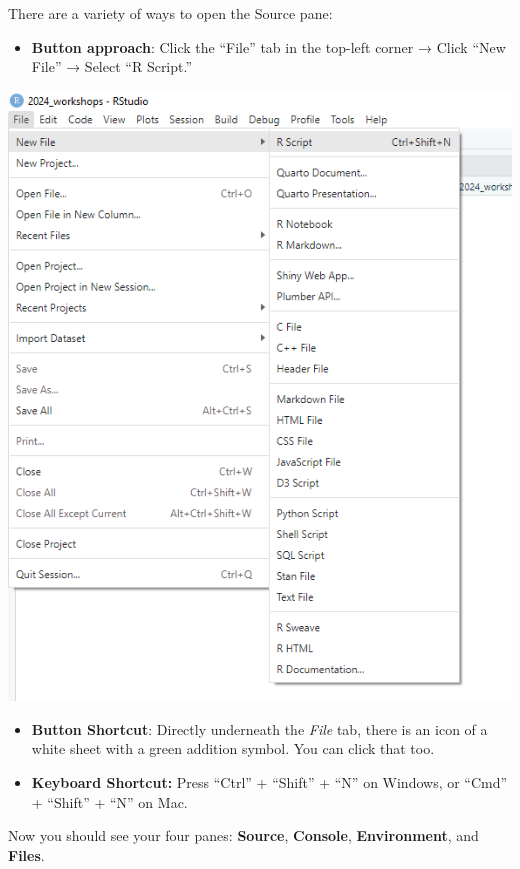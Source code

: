\documentclass[
]{book}
\providecommand{\tightlist}{%
  \setlength{\itemsep}{0pt}\setlength{\parskip}{0pt}}
\begin{document}
There are a variety of ways to open the Source pane:

\begin{itemize}
\tightlist
\item
  \textbf{Button approach}: Click the ``File'' tab in the top-left corner → Click ``New File'' → Select ``R Script.''
\end{itemize}

\includegraphics{img/rstudio_create_file.png}

\begin{itemize}
\item
  \textbf{Button Shortcut}: Directly underneath the \emph{File} tab, there is an icon of a white sheet with a green addition symbol. You can click that too.
\item
  \textbf{Keyboard Shortcut:} Press ``Ctrl'' + ``Shift'' + ``N'' on Windows, or ``Cmd'' + ``Shift'' + ``N'' on Mac.
\end{itemize}

Now you should see your four panes: \textbf{Source}, \textbf{Console}, \textbf{Environment}, and \textbf{Files}.
\end{document}
